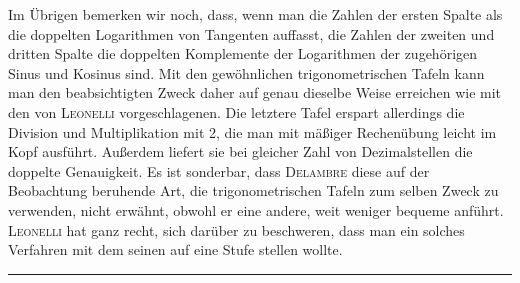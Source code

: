 \noindent Im Übrigen bemerken wir noch, dass, wenn man die Zahlen der ersten Spalte als die doppelten Logarithmen von Tangenten auffasst, die Zahlen der zweiten und dritten Spalte die doppelten Komplemente der Logarithmen der zugehörigen Sinus und Kosinus sind. Mit den gewöhnlichen trigonometrischen Tafeln kann man den beabsichtigten Zweck daher auf genau dieselbe Weise erreichen wie mit den von \textsc{Leonelli} vorgeschlagenen. Die letztere Tafel erspart allerdings die Division und Multiplikation mit 2, die man mit mäßiger Rechenübung leicht im Kopf ausführt. Außerdem liefert sie bei gleicher Zahl von Dezimalstellen die doppelte Genauigkeit. Es ist sonderbar, dass \textsc{Delambre} diese auf der Beobachtung beruhende Art, die trigonometrischen Tafeln zum selben Zweck zu verwenden, nicht erwähnt, obwohl er eine andere, weit weniger bequeme anführt. \textsc{Leonelli} hat ganz recht, sich darüber zu beschweren, dass man ein solches Verfahren mit dem seinen auf eine Stufe stellen wollte.\par\medskip\begin{center}\rule{.24\linewidth}{.3pt}\end{center}

